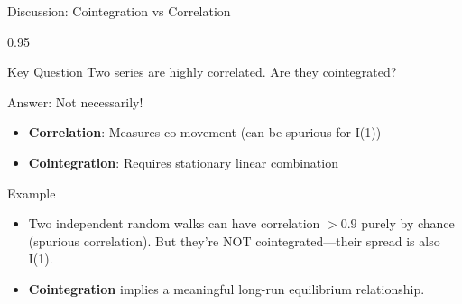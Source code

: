 \documentclass[9pt, aspectratio=169, t]{beamer}
\begin{document}
\begin{frame}{Discussion: Cointegration vs Correlation}
    \begin{cminipage}{0.95\textwidth}
    {\small
    \begin{alertblock}{Key Question}
        Two series are highly correlated. Are they cointegrated?
    \end{alertblock}
    \begin{block}{Answer: Not necessarily!}
        \begin{itemize}\setlength{\itemsep}{0pt}
            \item \textbf{Correlation}: Measures co-movement (can be spurious for I(1))
            \item \textbf{Cointegration}: Requires stationary linear combination
        \end{itemize}
    \end{block}
    \begin{exampleblock}{Example}
        \begin{itemize}\setlength{\itemsep}{0pt}
            \item Two independent random walks can have correlation $> 0.9$ purely by chance (spurious correlation). But they're NOT cointegrated---their spread is also I(1).
            \item \textbf{Cointegration} implies a meaningful long-run equilibrium relationship.
        \end{itemize}
    \end{exampleblock}
    }
    \end{cminipage}
\end{frame}
\end{document}
